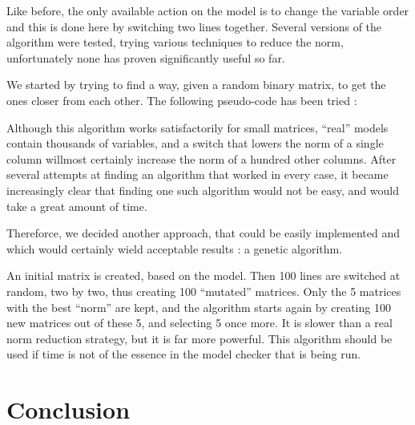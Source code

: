 \documentclass[12pt]{report}
\begin{document}
Like before, the only available action on the model is to change the variable order and this is done here by switching two lines together. Several versions of the algorithm were tested, trying various techniques to reduce the norm, unfortunately none has proven significantly useful so far. 

We started by trying to find a way, given a random binary matrix, to get the ones closer from each other. The following pseudo-code has been tried :

\begin{algorithm}
\begin{algorithmic}[1]
    \EndIf
  \EndWhile
\EndFunction
\end{algorithmic}
\end{algorithm}

Although this algorithm works satisfactorily for small matrices, \enquote{real} models contain thousands of variables, and a switch that lowers the norm of a single column willmost certainly increase the norm of a hundred other columns.
After several attempts at finding an algorithm that worked in every case, it became increasingly clear that finding one such algorithm would not be easy, and would take a great amount of time.

Thereforce, we decided another approach, that could be easily implemented and which would certainly wield acceptable results : a genetic algorithm. 

An initial matrix is created, based on the model. Then 100 lines are switched at random, two by two, thus creating 100 \enquote{mutated} matrices. Only the 5 matrices with the best \enquote{norm} are kept, and the algorithm starts again by creating 100 new matrices out of these 5, and selecting 5 once more. It is slower than a real norm reduction strategy, but it is far more powerful. This algorithm should be used if time is not of the essence in the model checker that is being run.

\newpage
\section*{Conclusion} %
\end{document}

